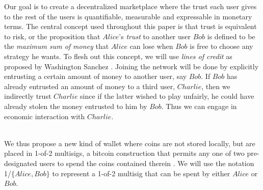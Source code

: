 \documentclass[11pt]{llncs}
\def\bitcoin{%
  \leavevmode
  \vtop{\offinterlineskip %
    \setbox0=\hbox{B}%
    \setbox2=\hbox to\wd0{\hfil\hskip-.03em
    \vrule height .3ex width .15ex\hskip .08em
    \vrule height .3ex width .15ex\hfil}
    \vbox{\copy2\box0}\box2}}
\theoremstyle{definition}
\begin{document}
     Our goal is to create a decentralized marketplace where the trust each user gives to the rest of the users is
     quantifiable, measurable and expressable in monetary terms. The central concept used throughout this paper is
     that trust is equivalent to risk, or the proposition that $Alice$'s \textit{trust} to another user $Bob$ is defined to
     be the \textit{maximum sum of money} that $Alice$ can lose when $Bob$ is free to choose any strategy he wants. To flesh
     out this concept, we will use \textit{lines of credit} as proposed by Washington Sanchez \cite{loc}. Joining the network
     will be done by explicitly entrusting a certain amount of money to another user, say $Bob$. If $Bob$ has already
     entrusted an amount of money to a third user, $Charlie$, then we indirectly trust $Charlie$ since if the latter wished
     to play unfairly, he could have already stolen the money entrusted to him by $Bob$. Thus we can engage in economic
     interaction with $Charlie$. \medskip \ \\
 \smallskip \ \\
     We thus propose a new kind of wallet where coins are not stored locally, but are placed in 1-of-2 multisigs, a bitcoin
     construction that permits any one of two pre-designated users to spend the coins contained therein \cite{multisig}. We
     will use the notation 1/$\{Alice, Bob\}$ to represent a 1-of-2 multisig that can be spent by either $Alice$ or $Bob$.
\end{document}
